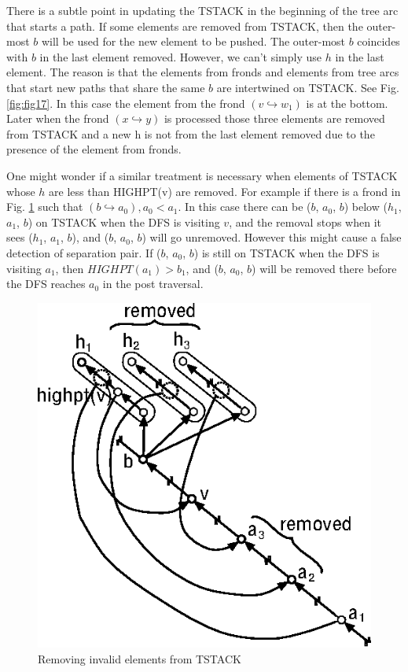 \documentclass[twoside,twocolumn]{article}
\begin{document}
There is a subtle point in updating the {\ttfamily TSTACK} in the beginning of the tree arc that starts a path.
If some elements are removed from {\ttfamily TSTACK}, then the outer-most $b$ will be used for the new element to be pushed.
The outer-most $b$ coincides with $b$ in the last element removed.
However, we can't simply use $h$ in the last element. The reason is that the elements from fronds and elements
from tree arcs that start new paths that share the same $b$ are intertwined on {\ttfamily TSTACK}.
See Fig. \ref{fig:fig17}. In this case the element from the frond $(v \hookrightarrow w_1)$ is at the bottom. Later when the frond
$(x \hookrightarrow y)$ is processed those three elements are removed from {\ttfamily TSTACK} and a new h is not from the last element
removed due to the presence of the element from fronds.

One might wonder if a similar treatment is necessary when elements of {\ttfamily TSTACK} whose $h$ are less than {\ttfamily HIGHPT(v)} are
removed. For example if there is a frond in Fig. \ref{fig:fig16} such that $(b \hookrightarrow a_0), a_0 < a_1$. In this case there can be
($b$, $a_0$, $b$) below ($h_1$, $a_1$, $b$) on {\ttfamily TSTACK} when the DFS is visiting $v$, and the removal stops when it sees ($h_1$, $a_1$, $b$), 
and ($b$, $a_0$, $b$)  will go unremoved. However this might cause a false detection of separation pair. If ($b$, $a_0$, $b$) is still on {\ttfamily TSTACK}
when the DFS is visiting $a_1$, then $HIGHPT(a_1) > b_1$, and   ($b$, $a_0$, $b$) will be removed there before the DFS reaches $a_0$ in the post traversal.

\begin{figure}[!htb]
\centering
\includegraphics[scale=1.0]{spqr_fig16.eps}
\caption{Removing invalid elements from TSTACK}
\label{fig:fig16}
\end{figure}
\end{document}
